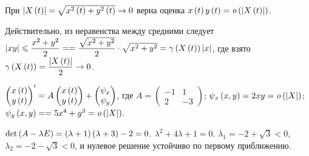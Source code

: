 \documentclass[a5paper,10pt]{article}
\begin{document}
\begin{framed}
    \begin{proposition}
    При $\left|X\left(t\right)\right| = \sqrt{x^2\left(t\right) + y^2\left(t\right)} \to 0$ верна оценка $x\left(t\right) y\left(t\right) = \text{\textit{o}}\left(\left|X\left(t\right)\right|\right)$.
    \end{proposition}
    
    Действительно, из неравенства между средними следует $\vbr{xy} \le \dfrac {x^2 + y^2} {2} = \linebreak =  \dfrac {\sqrt{x^2 + y^2}} {2} \cdot \sqrt{x^2 + y^2} = \gamma\br{X\br{t}} \vbr{x} $, где взято $\gamma\left(X\left(t\right)\right) = \dfrac {\left|X\left(t\right)\right|} {2} \to 0$.
\end{framed}

$\begin{pmatrix}x\left(t\right) \\ y\left(t\right)\end{pmatrix}' = A \begin{pmatrix}x\left(t\right) \\ y\left(t\right)\end{pmatrix} + \begin{pmatrix}\psi_{x} \\ \psi_{y} \end{pmatrix}$, где $A = \begin{pmatrix} -1 & 1 \\ 2 & -3 \end{pmatrix}$;
$\psi_{x}\left(x, y\right) = 2xy = \text{\textit{o}}\left(\left|X\right|\right)$;
$\psi_{y}\br{x, y} = \linebreak =  5x^{4} + y^{3} = \omicron\br{\vbr{X}}$.

$\det \left(A - \lambda E\right) = \left(\lambda + 1\right) \left(\lambda + 3\right) - 2 = 0$.
$\lambda^2 + 4 \lambda + 1 = 0$. $\lambda_{1} = -2 + \sqrt{3} < 0$, $\lambda_{2} = -2 - \sqrt{3} < 0$, и нулевое решение устойчиво по первому приближению.
\end{document}
